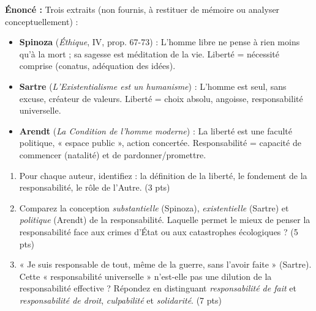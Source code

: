 \documentclass[11pt]{article}
\begin{document}
\begin{exercice}
\textbf{Énoncé :} Trois extraits (non fournis, à restituer de mémoire ou analyser conceptuellement) :
\begin{itemize}
    \item \textbf{Spinoza} (\textit{Éthique}, IV, prop. 67-73) : L'homme libre ne pense à rien moins qu'à la mort ; sa sagesse est méditation de la vie. Liberté = nécessité comprise (conatus, adéquation des idées).
    \item \textbf{Sartre} (\textit{L'Existentialisme est un humanisme}) : L'homme est seul, sans excuse, créateur de valeurs. Liberté = choix absolu, angoisse, responsabilité universelle.
    \item \textbf{Arendt} (\textit{La Condition de l'homme moderne}) : La liberté est une faculté politique, « espace public », action concertée. Responsabilité = capacité de commencer (natalité) et de pardonner/promettre.
\end{itemize}
\begin{enumerate}
    \item Pour chaque auteur, identifiez : la définition de la liberté, le fondement de la responsabilité, le rôle de l'Autre. (3 pts)
    \item Comparez la conception \textit{substantielle} (Spinoza), \textit{existentielle} (Sartre) et \textit{politique} (Arendt) de la responsabilité. Laquelle permet le mieux de penser la responsabilité face aux crimes d'État ou aux catastrophes écologiques ? (5 pts)
    \item « Je suis responsable de tout, même de la guerre, sans l'avoir faite » (Sartre). Cette « responsabilité universelle » n'est-elle pas une dilution de la responsabilité effective ? Répondez en distinguant \textit{responsabilité de fait} et \textit{responsabilité de droit}, \textit{culpabilité} et \textit{solidarité}. (7 pts)
\end{enumerate}
\end{exercice}
\end{document}
